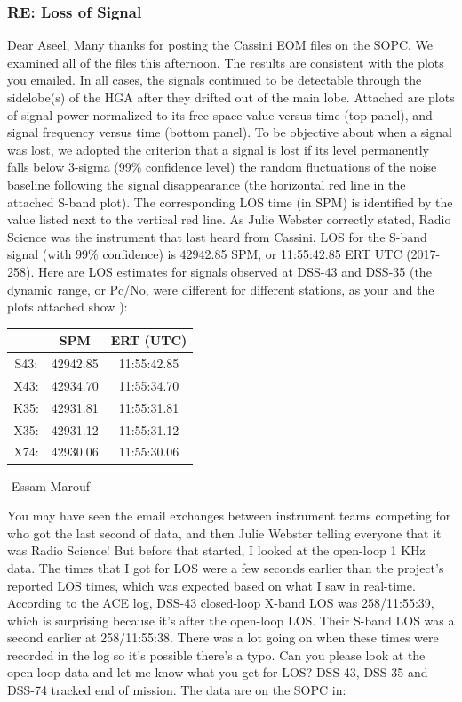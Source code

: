 \documentclass[crop=false,class=article,oneside]{standalone}
\begin{document}
\subsubsection{RE: Loss of Signal}
Dear Aseel, Many thanks for posting the Cassini EOM files on the SOPC.  We examined all of the files this afternoon. The results are consistent with the plots you emailed. In all cases, the signals continued to be detectable through the sidelobe(s) of the HGA after they  drifted out of the main lobe.  Attached are plots of signal power normalized to its free-space value versus time (top panel), and signal frequency versus time (bottom panel). To be objective about when a signal was lost, we adopted the criterion that a signal is lost if its level permanently falls below 3-sigma (99\% confidence level) the random fluctuations of the noise baseline following the signal disappearance (the horizontal red line in the attached S-band plot).  The corresponding LOS time (in SPM) is identified by the value listed next to the vertical red line. As Julie Webster correctly stated, Radio Science was the instrument that last heard from Cassini. LOS for the S-band signal (with 99\% confidence) is 42942.85 SPM, or 11:55:42.85 ERT UTC (2017-258). Here are LOS estimates for signals observed at DSS-43 and DSS-35 (the dynamic range, or Pc/No, were different for different stations, as your and the plots attached show ):
\begin{table}[H]
    \centering
    \begin{tabular}{c c c} 
    \hline
     & SPM      & ERT (UTC)    \\ 
    \hline
    S43: & 42942.85 & 11:55:42.85  \\
    X43: & 42934.70 & 11:55:34.70  \\
    K35: & 42931.81 & 11:55:31.81  \\
    X35: & 42931.12 & 11:55:31.12  \\
    X74: & 42930.06 & 11:55:30.06  \\
    \hline
\end{tabular}
\end{table}
-Essam Marouf\par
You may have seen the email exchanges between instrument teams competing for who got the last second of data, and then Julie Webster telling everyone that it was Radio Science! But before that started, I looked at the open-loop 1 KHz data. The times that I got for LOS were a few seconds earlier than the project's reported LOS times, which was expected based on what I saw in real-time. According to the ACE log, DSS-43 closed-loop X-band LOS was 258/11:55:39, which is surprising because it's after the open-loop LOS.  Their S-band LOS was a second earlier at 258/11:55:38.  There was a lot going on when these times were recorded in the log so it's possible there's a typo. Can you please look at the open-loop data and let me know what you get for LOS? DSS-43, DSS-35 and DSS-74 tracked end of mission. The data are on the SOPC in:
\end{document}
